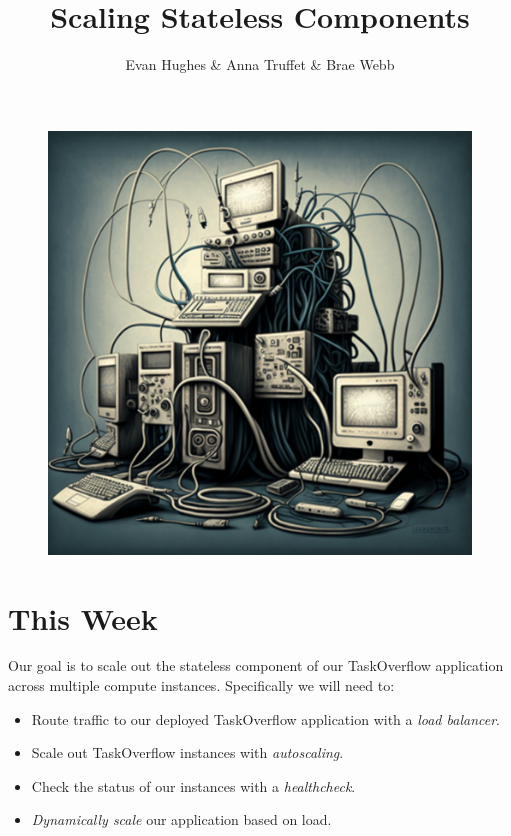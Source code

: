 \documentclass{csse4400}
\title{Scaling Stateless Components}
\author{Evan Hughes \& Anna Truffet \& Brae Webb }
\date{\week[practical]{6}}
\begin{document}
\maketitle

\begin{figure}[h]
    \begin{center}
        \includegraphics[scale=0.4]{images/scaling-out}
    \end{center}
\end{figure}


\section{This Week}
Our goal is to scale out the stateless component of our TaskOverflow application across multiple compute instances.
Specifically we will need to:
\begin{itemize}
    \item Route traffic to our deployed TaskOverflow application with a \textsl{load balancer}.
    \item Scale out TaskOverflow instances with \textsl{autoscaling}.
    \item Check the status of our instances with a \textsl{healthcheck}.
    \item \textsl{Dynamically scale} our application based on load.
\end{itemize}
\end{document}
